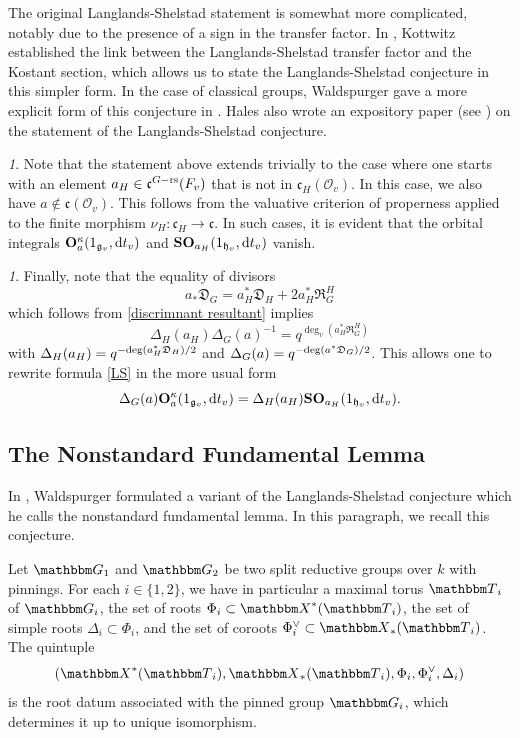 \documentclass[12pt,english]{smfart}
\numberwithin{equation}{subsection}
\theoremstyle{remark}
\newtheorem{numero}[equation]{}
\newcommand\calO{{\mathscr O}}
\newcommand\frakg{{\mathfrak g}}
\newcommand\frakc{{\mathfrak c}}
\newcommand\bbT{{\mathbbm T}}
\newcommand\bbG{{\mathbbm G}}
\newcommand\bbX{{\mathbbm X}}
\newcommand\frakh{\mathfrak h}
\newcommand\rs{{\rm rs}}
\newcommand\resultant{\mathfrak R}
\newcommand\discrim{\mathfrak D}
\begin{document}
The original Langlands-Shelstad statement is somewhat more complicated, notably due to the presence of a sign in the transfer factor. In \cite{K-FdT}, Kottwitz established the link between the Langlands-Shelstad transfer factor and the Kostant section, which allows us to state the Langlands-Shelstad conjecture in this simpler form. In the case of classical groups, Waldspurger gave a more explicit form of this conjecture in \cite{W-pav}. Hales also wrote an expository paper (see \cite{Hales}) on the statement of the Langlands-Shelstad conjecture.

\begin{numero}
Note that the statement above extends trivially to the case where one starts with an element $a_H\in \frakc^{G-\rs}(F_v)$ that is not in $\frakc_H(\calO_v)$. In this case, we also have $a\notin\frakc(\calO_v)$. This follows from the valuative criterion of properness applied to the finite morphism $\nu_H:\frakc_H\rightarrow\frakc$. In such cases, it is evident that the orbital integrals ${\bf O}_a^\kappa(1_{\frakg_v},{\rm d}t_v)$ and ${\bf SO}_{a_H}(1_{\frakh_v},{\rm d}t_v)$ vanish.
\end{numero}

\begin{numero}
Finally, note that the equality of divisors
$$a_*\discrim_G=a_H^* \discrim_H+ 2 a_H^* \resultant_G^H$$
which follows from \ref{discrimnant resultant} implies
$$\Delta_H(a_H) \Delta_G(a)^{-1}= q^{\deg_v(a_H^* \resultant_G^H)}$$
with $\Delta_H(a_H)=q^{-{\rm deg}(a_H^* \discrim_H)/ 2}$ and
$\Delta_G(a)=q^{-{\rm deg}(a^* \discrim_G)/ 2}$. This allows one to rewrite formula \ref{LS} in the more usual form
$$\Delta_G(a){\bf O}_a^\kappa(1_{\frakg_v},{\rm d}t_v)=\Delta_H(a_H){\bf SO}_{a_H}(1_{\frakh_v},{\rm d}t_v).
$$
\end{numero}

\subsection{The Nonstandard Fundamental Lemma}

In \cite{W-tordu}, Waldspurger formulated a variant of the Langlands-Shelstad conjecture which he calls the nonstandard fundamental lemma. In this paragraph, we recall this conjecture.

Let $\bbG_1$ and $\bbG_2$ be two split reductive groups over $k$ with pinnings. For each $i\in\{1,2\}$, we have in particular a maximal torus $\bbT_i$ of $\bbG_i$, the set of roots $\Phi_i\subset \bbX^*(\bbT_i)$, the set of simple roots $\Delta_i\subset \Phi_i$, and the set of coroots $\Phi_i^\vee\subset \bbX_*(\bbT_i)$. The quintuple
$$(\bbX^*(\bbT_i),\bbX_*(\bbT_i),\Phi_i,\Phi_i^\vee,\Delta_i)$$
is the root datum associated with the pinned group $\bbG_i$, which determines it up to unique isomorphism.
\end{document}
